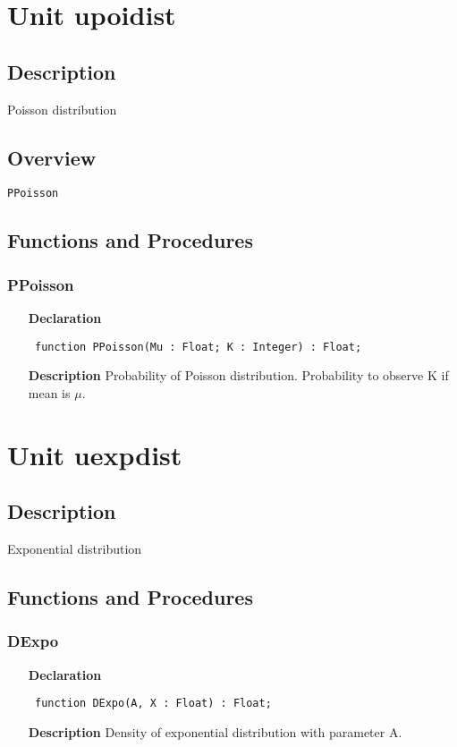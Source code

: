 \documentclass[12pt,a4paper,oneside]{report}
\newcommand{\declarationitem}[1]{\textbf{#1}}
\newcommand{\descriptiontitle}[1]{\textbf{#1}}
\newcommand{\code}[1]{\texttt{#1}}
\begin{document}
\section{Unit upoidist}
\label{upoidist}
\subsection{Description}
Poisson distribution 
\subsection{Overview}
\begin{description}
	\item[\texttt{PPoisson}]
\end{description}
\subsection{Functions and Procedures}
\subsubsection{PPoisson}
\label{upoidist-PPoisson}
\begin{itemize}\item[\declarationitem{Declaration}\hfill]
	\begin{flushleft}
		\code{
			function PPoisson(Mu : Float; K : Integer) : Float;}
	\end{flushleft}
	\item[\descriptiontitle{Description}]
	Probability of Poisson distribution. Probability to observe K if mean is $\mu$.
\end{itemize}

\section{Unit uexpdist}
\label{uexpdist}
\subsection{Description}
Exponential distribution 
\subsection{Functions and Procedures}
\subsubsection{DExpo}
\label{uexpdist-DExpo}
\begin{itemize}\item[\declarationitem{Declaration}\hfill]
	\begin{flushleft}
		\code{
			function DExpo(A, X : Float) : Float;}
	\end{flushleft}
	\item[\descriptiontitle{Description}]
	Density of exponential distribution with parameter A.
\end{itemize}
\end{document}
